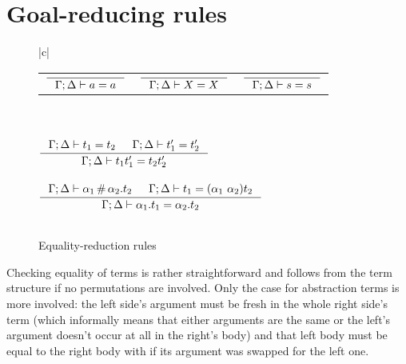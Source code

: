 \documentclass[english, mgr]{iithesis}
\newcommand{\solverRule}{\vdash}
\begin{document}
\section{Goal-reducing rules}
\begin{figure}[htbp]
    \centering
    \begin{tabular}{|c|}
      \hline \\
      \begin{tabularx}{\textwidth}{CCC} $
      \inference{
      }{
        \cEnv ; \icEnv \solverRule \atomv = \atomv
      }
      $ & $
      \inference{
      }{
        \cEnv ; \icEnv \solverRule \termv = \termv
      }
      $ & $
      \inference{
      }{
        \cEnv ; \icEnv \solverRule \symb = \symb
      }
      $
      \end{tabularx}
      \\ \\ $
      \inference{
        \cEnv ; \icEnv \solverRule \term_1 = \term_2
        &
        \cEnv ; \icEnv \solverRule \term_1' = \term_2'
      }{
        \cEnv ; \icEnv \solverRule \term_1 \term_1' = \term_2 \term_2'
      }
      $ \\ \\ $
      \inference{
        \cEnv ; \icEnv \solverRule \atomexp_1 \cfresh \tbind{\atomexp_2}\term_2
        &
        \cEnv ; \icEnv \solverRule \term_1 = \permswap{\atomexp_1}{\atomexp_2} \term_2
      }{
        \cEnv ; \icEnv \solverRule \tbind{\atomexp_1} \term_1 = \tbind{\atomexp_2} \term_2
      }
      $ \\ \\ \hline
      \end{tabular}
  \caption{Equality-reduction rules}
  \label{fig:equality-reduction-rules}
\end{figure}
Checking equality of terms is rather straightforward and follows from the
term structure if no permutations are involved.
Only the case for abstraction terms is more involved:
the left side's argument must be fresh in the whole right side's term
(which informally means that either arguments are the same or
the left's argument doesn't occur at all in the right's body)
and that left body must be equal to the right body with if its argument was swapped for the left one.
\end{document}
